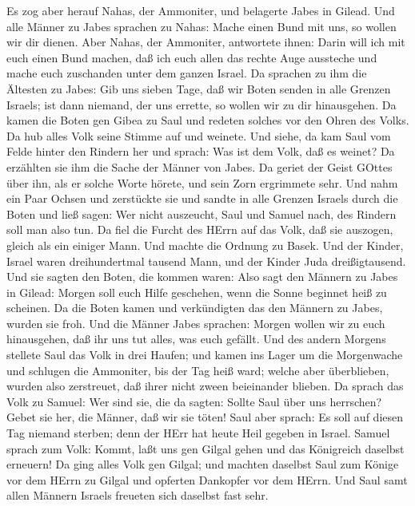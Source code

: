  Es zog aber herauf Nahas, der Ammoniter, und belagerte
Jabes in Gilead. Und alle Männer zu Jabes sprachen zu Nahas: Mache einen
Bund mit uns, so wollen wir dir dienen.  Aber Nahas, der
Ammoniter, antwortete ihnen: Darin will ich mit euch einen Bund machen,
daß ich euch allen das rechte Auge aussteche und mache euch zuschanden
unter dem ganzen Israel.  Da sprachen zu ihm die Ältesten zu
Jabes: Gib uns sieben Tage, daß wir Boten senden in alle Grenzen
Israels; ist dann niemand, der uns errette, so wollen wir zu dir
hinausgehen.  Da kamen die Boten gen Gibea zu Saul und
redeten solches vor den Ohren des Volks. Da hub alles Volk seine Stimme
auf und weinete.  Und siehe, da kam Saul vom Felde hinter
den Rindern her und sprach: Was ist dem Volk, daß es weinet? Da
erzählten sie ihm die Sache der Männer von Jabes.  Da geriet
der Geist GOttes über ihn, als er solche Worte hörete, und sein Zorn
ergrimmete sehr.  Und nahm ein Paar Ochsen und zerstückte
sie und sandte in alle Grenzen Israels durch die Boten und ließ sagen:
Wer nicht auszeucht, Saul und Samuel nach, des Rindern soll man also
tun. Da fiel die Furcht des HErrn auf das Volk, daß sie auszogen, gleich
als ein einiger Mann.  Und machte die Ordnung zu Basek. Und
der Kinder, Israel waren dreihundertmal tausend Mann, und der Kinder
Juda dreißigtausend.  Und sie sagten den Boten, die kommen
waren: Also sagt den Männern zu Jabes in Gilead: Morgen soll euch Hilfe
geschehen, wenn die Sonne beginnet heiß zu scheinen. Da die Boten kamen
und verkündigten das den Männern zu Jabes, wurden sie froh.
 Und die Männer Jabes sprachen: Morgen wollen wir zu euch
hinausgehen, daß ihr uns tut alles, was euch gefällt.  Und
des andern Morgens stellete Saul das Volk in drei Haufen; und kamen ins
Lager um die Morgenwache und schlugen die Ammoniter, bis der Tag heiß
ward; welche aber überblieben, wurden also zerstreuet, daß ihrer nicht
zween beieinander blieben.  Da sprach das Volk zu Samuel:
Wer sind sie, die da sagten: Sollte Saul über uns herrschen? Gebet sie
her, die Männer, daß wir sie töten!  Saul aber sprach: Es
soll auf diesen Tag niemand sterben; denn der HErr hat heute Heil
gegeben in Israel.  Samuel sprach zum Volk: Kommt, laßt uns
gen Gilgal gehen und das Königreich daselbst erneuern!  Da
ging alles Volk gen Gilgal; und machten daselbst Saul zum Könige vor dem
HErrn zu Gilgal und opferten Dankopfer vor dem HErrn. Und Saul samt
allen Männern Israels freueten sich daselbst fast sehr.

